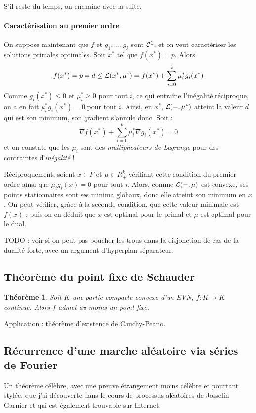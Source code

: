 \documentclass[a4paper, 11pt]{article}
\def\L{{\cal{L}}}
\def\Cf{{\cal{C}}}
\newtheorem*{theorem}{Théorème}
\begin{document}
S'il reste du temps, on enchaîne avec la suite.

\paragraph{Caractérisation au premier ordre} On suppose maintenant que $f$ et
$g_1, \ldots, g_k$ sont $\Cf^1$, et on veut caractériser les solutions primales
optimales. Soit $x^*$ tel que $f(x^*) = p$. Alors
\[ f(x^*) = p = d \leq \L(x^*, \mu^*) = f(x^*) + \sum_{i=0}^k \mu^*_i
  g_i(x^*) \]
Comme $g_i(x^*) \leq 0$ et $\mu^*_i \geq 0$ pour tout $i$, ce qui entraîne
l'inégalité réciproque, on a en fait $\mu^*_i g_i(x^*) = 0$ pour tout $i$.
Ainsi, en $x^*$, $\L(-, \mu^*)$ atteint la valeur $d$ qui est son minimum, son
gradient s'annule donc. Soit :
\[ \nabla f(x^*) + \sum_{i=0}^k \mu^*_i \nabla g_i(x^*) = 0 \]
et on constate que les $\mu_i$ sont des \emph{multiplicateurs de Lagrange} pour
des contraintes d'\emph{inégalité} !

Réciproquement, soient $x \in F$ et $\mu \in R_+^k$ vérifiant cette condition du
premier ordre ainsi que $\mu_i g_i(x) = 0$ pour tout $i$. Alors, comme
$\L(-,\mu)$ est convexe, ses points stationnaires sont ses minima globaux, donc
elle atteint son minimum en $x$. On peut vérifier, grâce à la seconde condition,
que cette valeur minimale est $f(x)$ ; puis on en déduit que $x$ est optimal
pour le primal et $\mu$ est optimal pour le dual.

TODO : voir si on peut pas boucher les trous
dans la disjonction de cas de la dualité forte, avec un argument d'hyperplan
séparateur.



\subsection{Théorème du point fixe de Schauder}

\begin{theorem}
  Soit $K$ une partie compacte convexe d'un EVN, $f : K \to K$ continue. Alors
  $f$ admet au moins un point fixe.
\end{theorem}
Application : théorème d'existence de Cauchy-Peano.


\subsection{Récurrence d'une marche aléatoire via séries de Fourier}

Un théorème célèbre, avec une preuve étrangement moins célèbre et pourtant
stylée, que j'ai découverte dans le cours de processus aléatoires de Josselin
Garnier et qui est également trouvable sur Internet.
\end{document}
